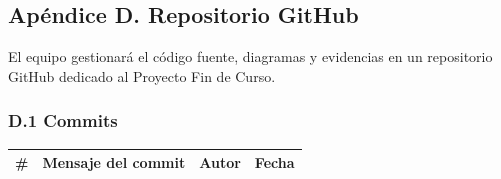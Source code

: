 \documentclass[11pt,a4paper]{article}
\begin{document}
	
	
	\subsection{Apéndice D. Repositorio GitHub}
	
	El equipo gestionará el código fuente, diagramas y evidencias en un repositorio GitHub dedicado al Proyecto Fin de Curso.
	
	\subsubsection{D.1 Commits}
	
	\begin{longtable}{p{} p{} p{} p{}}
		
		\toprule
		\textbf{\#} &
		\textbf{Mensaje del commit} &
		\textbf{Autor} &
		\textbf{Fecha} \\
		\midrule
		\endhead
		

\end{longtable}
\end{document}
